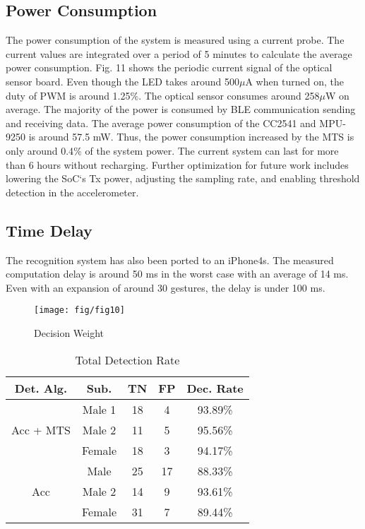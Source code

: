 \subsection{Power Consumption}
The power consumption of the system is measured using a
current probe. The current values are integrated over a period
of 5 minutes to calculate the average power consumption.
Fig. 11 shows the periodic current signal of the optical sensor
board. Even though the LED takes around 500$\mu$A when
turned on, the duty of PWM is around 1.25$\%$. The optical
sensor consumes around 258$\mu$W on average. The majority
of the power is consumed by BLE communication sending
and receiving data. The average power consumption of the
CC2541 and MPU-9250 is around 57.5 mW. Thus, the power
consumption increased by the MTS is only around 0.4$\%$ of
the system power. The current system can last for more than 6
hours without recharging. Further optimization for future work
includes lowering the SoC`s Tx power, adjusting the sampling
rate, and enabling threshold detection in the accelerometer.

\subsection{Time Delay}
The recognition system has also been ported to an
iPhone4s. The measured computation delay is around 50 ms
in the worst case with an average of 14 ms. Even with an
expansion of around 30 gestures, the delay is under 100 ms.

\begin{figure}[b]
\centering
\texttt{[image: fig/fig10]}
\caption{Decision Weight}
\end{figure}

\begin{table}
\centering
\caption{Total Detection Rate}
\begin{tabular}{|c|c|c|c|c|} 
\toprule
Det. Alg.                  & Sub.   & TN & FP & Dec. Rate  \\ 
\hline
\multirow{3}{*}{Acc + MTS} & Male 1 & 18 & 4  & 93.89\%    \\ 
\cline{2-5}
                           & Male 2 & 11 & 5  & 95.56\%    \\ 
\cline{2-5}
                           & Female & 18 & 3  & 94.17\%    \\ 
\hline
\multirow{3}{*}{Acc}       & Male   & 25 & 17 & 88.33\%    \\ 
\cline{2-5}
                           & Male 2 & 14 & 9  & 93.61\%    \\ 
\cline{2-5}
                           & Female & 31 & 7  & 89.44\%    \\
\bottomrule
\end{tabular}
\end{table}


